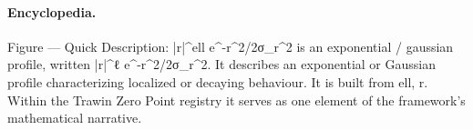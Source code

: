 \paragraph{Encyclopedia.}
Figure — Quick Description: |r|\textasciicircum{}ell e\textasciicircum{}-r\textasciicircum{}2/2σ\_r\textasciicircum{}2 is an exponential / gaussian profile, written |r|\textasciicircum{}ℓ e\textasciicircum{}-r\textasciicircum{}2/2σ\_r\textasciicircum{}2. It describes an exponential or Gaussian profile characterizing localized or decaying behaviour. It is built from ell, r. Within the Trawin Zero Point registry it serves as one element of the framework's mathematical narrative.
